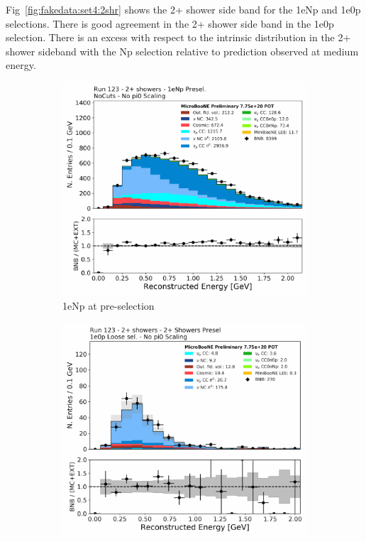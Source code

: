 Fig~\ref{fig:fakedata:set4:2shr} shows the 2+ shower side band for the 1eNp and 1e0p selections. There is good agreement in the 2+ shower side band in the 1e0p selection.  There is an excess with respect to the \nue intrinsic distribution in the 2+ shower sideband with the Np selection relative to prediction observed at medium energy.  

\begin{figure}[H] 
\begin{center}
    \begin{subfigure}[b]{0.45\textwidth}
    \centering
    \includegraphics[width=1.00\textwidth]{Fakedata/set4/np_2shr.pdf}
    \caption{\label{fig:fakedata:set4:2shrnp} 1eNp at pre-selection}
    \end{subfigure}
    \begin{subfigure}[b]{0.45\textwidth}
    \centering
    \includegraphics[width=1.00\textwidth]{Fakedata/set4/zp_2shr.pdf}

\end{subfigure}
\end{center}
\end{figure}
